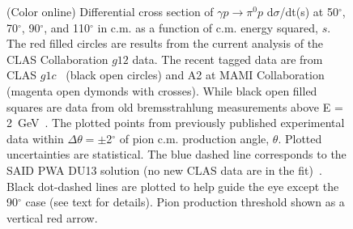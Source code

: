 \documentclass[aps,prc,onecolumn,floatfix,showpacs,preprintnumbers,amsmath,amssymb,superscriptaddress]{revtex4-1}
\begin{document}
\begin{figure}[htb!]
        \caption {(Color online) Differential cross section of 
		$\gamma p\to\pi^0p$ d$\sigma$/dt(s) at 
		50$^\circ$, 70$^\circ$, 90$^\circ$, and 
		110$^\circ$ in c.m. as a function of c.m. 
		energy squared, $s$. The red filled circles are 
		results from the current analysis of the CLAS 
		Collaboration $g12$ data. The recent tagged data 
		are from CLAS $g1c$~\protect\cite{du07} (black 
		open circles) and A2 at MAMI 
		Collaboration~\protect\cite{mami} (magenta open 
		dymonds with crosses). While black open filled 
		squares are data from old bremsstrahlung
		measurements above E = 2~GeV~\protect\cite{brem}. 
		The plotted points from previously published 
		experimental data within $\Delta\theta =
		\pm$2$^\circ$ of pion c.m. production angle, 
		$\theta$.  Plotted uncertainties are statistical.  
		The blue dashed line corresponds to the SAID PWA 
		DU13 solution (no new CLAS data are in the 
		fit)~\protect\cite{du13}.  Black dot-dashed lines 
		are plotted to help guide the eye except the 
		90$^\circ$ case (see text for details). Pion 
		production threshold shown as a vertical red 
		arrow.} \label{fig:scaling}
\end{figure}
\end{document}
